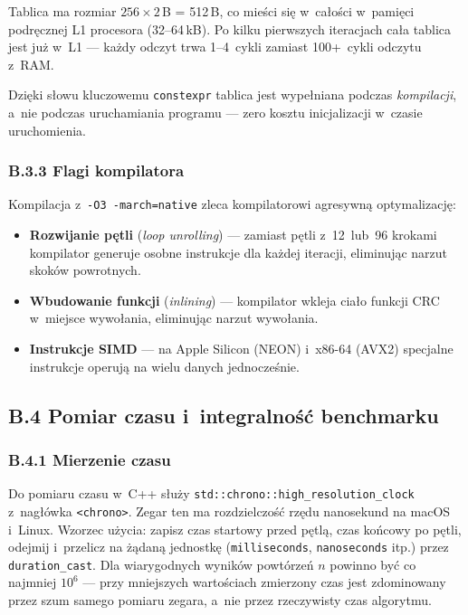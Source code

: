 \documentclass[12pt,a4paper]{article}
\begin{document}
Tablica ma rozmiar $256 \times 2$\,B = 512\,B, co mieści się w~całości
w~pamięci podręcznej L1 procesora (32–64\,kB). Po kilku pierwszych iteracjach
cała tablica jest już w~L1 — każdy odczyt trwa 1–4~cykli zamiast 100+~cykli
odczytu z~RAM.

Dzięki słowu kluczowemu \texttt{constexpr} tablica jest wypełniana podczas
\emph{kompilacji}, a~nie podczas uruchamiania programu — zero kosztu
inicjalizacji w~czasie uruchomienia.

\subsubsection*{B.3.3 Flagi kompilatora}

Kompilacja z~\texttt{-O3 -march=native} zleca kompilatorowi agresywną
optymalizację:
\begin{itemize}
    \item \textbf{Rozwijanie pętli} (\textit{loop unrolling}) — zamiast
          pętli z~12~lub~96 krokami kompilator generuje osobne instrukcje
          dla każdej iteracji, eliminując narzut skoków powrotnych.
    \item \textbf{Wbudowanie funkcji} (\textit{inlining}) — kompilator wkleja
          ciało funkcji CRC w~miejsce wywołania, eliminując narzut wywołania.
    \item \textbf{Instrukcje SIMD} — na Apple Silicon (NEON) i~x86-64 (AVX2)
          specjalne instrukcje operują na wielu danych jednocześnie.
\end{itemize}

\subsection*{B.4 Pomiar czasu i~integralność benchmarku}

\subsubsection*{B.4.1 Mierzenie czasu}

Do pomiaru czasu w~C++ służy \texttt{std::chrono::high\_resolution\_clock}
z~nagłówka \texttt{<chrono>}. Zegar ten ma rozdzielczość rzędu nanosekund
na macOS i~Linux. Wzorzec użycia: zapisz czas startowy przed pętlą, czas
końcowy po pętli, odejmij i~przelicz na żądaną jednostkę (\texttt{milliseconds},
\texttt{nanoseconds} itp.) przez \texttt{duration\_cast}.
Dla wiarygodnych wyników powtórzeń $n$ powinno być co najmniej $10^6$ —
przy mniejszych wartościach zmierzony czas jest zdominowany przez szum
samego pomiaru zegara, a~nie przez rzeczywisty czas algorytmu.
\end{document}
